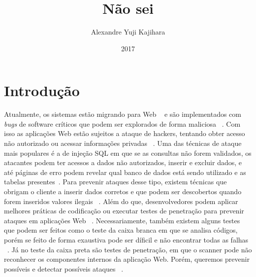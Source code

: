\documentclass[brazil, utf8]{article}
\begin{document}
\title{Não sei}
\author{Alexandre Yuji Kajihara}
\date{2017}

\maketitle 

\section{Introdução}
Atualmente, os sistemas estão migrando para Web ~\cite{Cimapa2010} e são implementados com \textit{bugs}
 de software críticos que podem ser explorados de forma maliciosa ~\cite{Vieira2009}. Com isso as 
 aplicações Web estão sujeitos a ataque de hackers, tentando obter acesso não autorizado ou acessar 
 informações privadas ~\cite{Kumar2012}. Uma das técnicas de ataque mais populares é a de injeção SQL 
 em que se as consultas não forem validados, os atacantes podem ter acessos a dados não autorizados, 
 inserir e excluir dados, e até páginas de erro podem revelar qual banco de dados está sendo utilizado 
 e as tabelas presentes~\cite{Cimapa2009}. Para prevenir ataques desse tipo, existem técnicas que 
 obrigam o cliente a inserir dados corretos e que podem ser descobertos quando forem inseridos  valores 
 ilegais ~\cite{Kumar2012}. Além do que, desenvolvedores podem aplicar melhores práticas de codificação 
 ou executar testes de penetração para prevenir ataques em aplicações Web ~\cite{Vieira2009}. 
 Necessariamente, também existem alguns testes que podem ser feitos como o teste da caixa branca em que 
 se analisa códigos, porém se feito de forma exaustiva pode ser díficil e não encontrar todas as falhas 
 ~\cite{Vieira2009}. Já no teste da caixa preta são testes de penetração, em que o scanner pode não 
 reconhecer os componentes internos da aplicação Web. Porém, queremos prevenir possíveis e detectar 
 possíveis ataques ~\cite{Vieira2009}.




\end{document}
